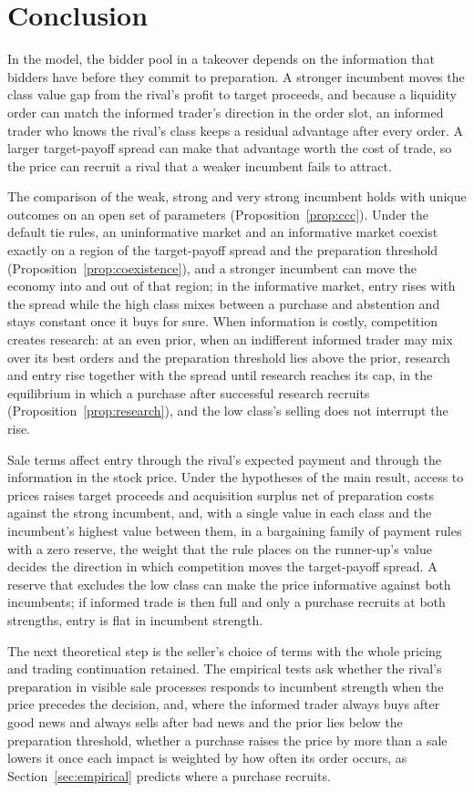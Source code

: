 \section{Conclusion}\label{sec:conclusion}

In the model, the bidder pool in a takeover depends on the information that bidders have before they commit to
preparation. A
stronger incumbent moves the class value gap from the rival's profit to target proceeds, and because a
liquidity order can match the informed trader's direction in the order slot, an informed trader who knows the rival's
class keeps a residual advantage after every order. A larger target-payoff spread can make that advantage worth
the cost of trade, so the price can recruit a rival that a weaker incumbent fails to attract.

The comparison of the weak, strong and very strong incumbent holds with unique outcomes on an open set of
parameters (Proposition~\ref{prop:ccc}). Under the default tie rules, an uninformative market and an informative market
coexist exactly on a region of the target-payoff spread and the preparation threshold
(Proposition~\ref{prop:coexistence}), and a stronger incumbent can move the economy into and out of that region; in
the informative market, entry rises with the spread while the high class mixes between a purchase and abstention
and stays constant once it buys for sure. When information is costly, competition creates research: at an even
prior, when an indifferent informed trader may mix over its best orders and the preparation threshold lies above the prior,
research and entry rise together with the spread until research reaches its cap, in the equilibrium in which a
purchase after successful research recruits (Proposition~\ref{prop:research}), and the low class's selling does not
interrupt the rise.

Sale terms affect entry through the rival's expected payment and through the information in the stock price.
Under the hypotheses of the main result, access to prices raises target proceeds and acquisition surplus net of
preparation costs against the strong incumbent, and, with a single value in each class and the incumbent's highest
value between them, in a bargaining family of payment rules with a zero reserve, the weight that the rule places
on the runner-up's value decides the direction in which competition moves the target-payoff spread. A reserve that
excludes the low class can make the price informative against both
incumbents; if informed trade is then full and only a purchase recruits at both strengths, entry is flat in
incumbent strength.

The next theoretical step is the seller's choice of terms with the whole pricing and trading continuation retained.
The empirical tests ask whether the rival's preparation in visible sale processes responds to incumbent
strength when the price precedes the decision, and, where the informed trader always buys after good news and always sells
after bad news and the prior lies below the preparation threshold, whether a purchase raises the price by more than a sale lowers
it once each impact is weighted by how often its order occurs, as Section~\ref{sec:empirical} predicts where a
purchase recruits.
